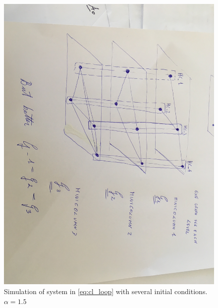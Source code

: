 \begin{figure}
    \centering
    \includegraphics[width=\textwidth]{text/analysis/fig/2by2adapt/image1.jpeg}
    \caption{Simulation of system in \eqref{eq:cl_loop} with several initial conditions. $\alpha=1.5$}
    \label{fig:network_levels}
\end{figure}
